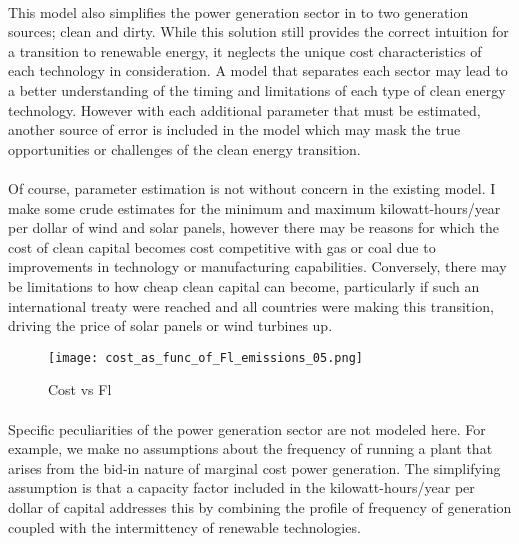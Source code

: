 \documentclass{article}
\begin{document}
\paragraph{} This model also simplifies the power generation sector in to two generation sources; clean and dirty. While this solution still provides the correct intuition for a transition to renewable energy, it neglects the unique cost characteristics of each technology in consideration. A model that separates each sector may lead to a better understanding of the timing and limitations of each type of clean energy technology. However with each additional parameter that must be estimated, another source of error is included in the model which may mask the true opportunities or challenges of the clean energy transition. 

\paragraph{} Of course, parameter estimation is not without concern in the existing model. I make some crude estimates for the minimum and maximum kilowatt-hours/year per dollar of wind and solar panels, however there may be reasons for which the cost of clean capital becomes cost competitive with gas or coal due to improvements in technology or manufacturing capabilities. Conversely, there may be limitations to how cheap clean capital can become, particularly if such an international treaty were reached and all countries were making this transition, driving the price of solar panels or wind turbines up. 

\begin{figure}[h]
\texttt{[image: cost\_as\_func\_of\_Fl\_emissions\_05.png]}
\caption{Cost vs Fl\label{fig:costVsFl}}
\end{figure}

\paragraph{} Specific peculiarities of the power generation sector are not modeled here. For example, we make no assumptions about the frequency of running a plant that arises from the bid-in nature of marginal cost power generation. The simplifying assumption is that a capacity factor included in the kilowatt-hours/year per dollar of capital addresses this by combining the profile of frequency of generation coupled with the intermittency of renewable technologies. 
\end{document}
